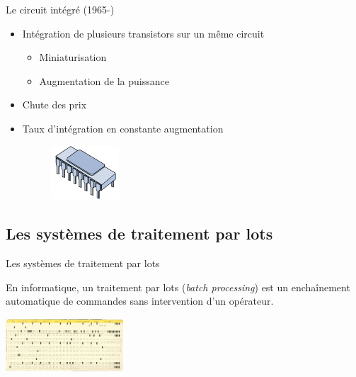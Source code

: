 \begin{frame}{Le circuit intégré (1965-)}
\begin{itemize}
\item Intégration de plusieurs transistors sur un même circuit
\begin{itemize}
\item Miniaturisation
\item Augmentation de la puissance
\end{itemize}
\item Chute des prix
\item Taux d'intégration en constante augmentation
\begin{figure}[tr]
	\includegraphics[height=2cm]{../illustration/circuit_integre.png}
\end{figure}
\end{itemize}
\end{frame}


\subsection{Les systèmes de traitement par lots}

\begin{frame}{Les systèmes de traitement par lots}
\begin{definition}
En informatique, un traitement par lots (\emph{batch processing}) est
un enchaînement automatique de commandes sans intervention d'un opérateur.
\end{definition}
\includegraphics[height=2cm]{../illustration/carte_jcl.png}
\end{frame}


